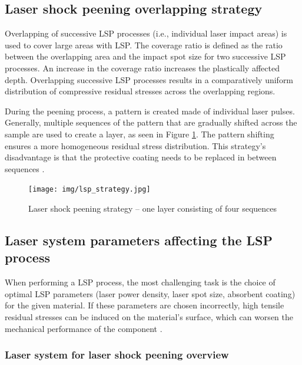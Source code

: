 \subsection{Laser shock peening overlapping strategy}

Overlapping of successive LSP processes (i.e., individual laser impact areas) is used to cover large areas with LSP. The coverage ratio is defined as the ratio between the overlapping area and the impact spot size for two successive LSP processes. An increase in the coverage ratio increases the plastically affected depth. Overlapping successive LSP processes results in a comparatively uniform distribution of compressive residual stresses across the overlapping regions.

During the peening process, a pattern is created made of individual laser pulses. Generally, multiple sequences of the pattern that are gradually shifted across the sample are used to create a layer, as seen in Figure \ref{fig:lspstrategy}. The pattern shifting ensures a more homogeneous residual stress distribution. This strategy's disadvantage is that the protective coating needs to be replaced in between sequences \cite{kaufman}.

\begin{figure}[h]
    \centering
    \texttt{[image: img/lsp\_strategy.jpg]}
    \caption{Laser shock peening strategy -- one layer consisting of four sequences \protect\cite{bohm_kaufman_brajer_rostohar_2019}}
    \label{fig:lspstrategy}
\end{figure}



\subsection{Laser system parameters affecting the LSP process}

When performing a LSP process, the most challenging task is the choice of optimal LSP parameters (laser power density, laser spot size, absorbent coating) for the given material. If these parameters are chosen incorrectly, high tensile residual stresses can be induced on the material's surface, which can worsen the mechanical performance of the component \cite{clauer_holbrook_fairand_1981}.  

\subsubsection*{Laser system for laser shock peening overview}

